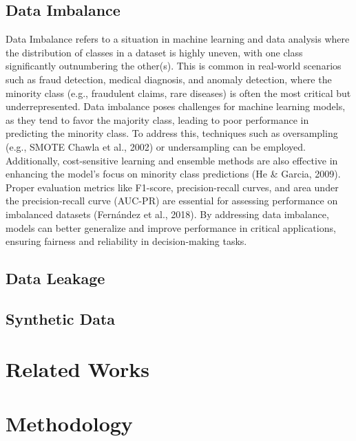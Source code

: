 \documentclass[twoside,11pt]{article}
\begin{document}
\subsection{Data Imbalance}
Data Imbalance refers to a situation in machine learning and data analysis where the distribution of classes in a dataset is highly uneven, with one class significantly outnumbering the other(s). This is common in real-world scenarios such as fraud detection, medical diagnosis, and anomaly detection, where the minority class (e.g., fraudulent claims, rare diseases) is often the most critical but underrepresented. Data imbalance poses challenges for machine learning models, as they tend to favor the majority class, leading to poor performance in predicting the minority class.
To address this, techniques such as oversampling (e.g., SMOTE Chawla et al., 2002) or undersampling can be employed. Additionally, cost-sensitive learning and ensemble methods are also effective in enhancing the model's focus on minority class predictions (He & Garcia, 2009). Proper evaluation metrics like F1-score, precision-recall curves, and area under the precision-recall curve (AUC-PR) are essential for assessing performance on imbalanced datasets (Fernández et al., 2018).
By addressing data imbalance, models can better generalize and improve performance in critical applications, ensuring fairness and reliability in decision-making tasks.
\subsection{Data Leakage}

\subsection{Synthetic Data}


\section{Related Works}


\section{Methodology}
\end{document}
